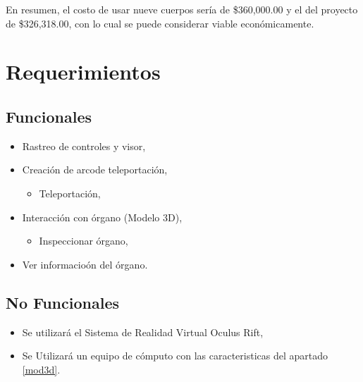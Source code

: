 En resumen, el costo de usar nueve cuerpos sería de \$360,000.00 y el del proyecto de \$326,318.00, con lo cual se puede considerar viable económicamente.\\

\section{Requerimientos}

\subsection{Funcionales}
\begin{itemize}
  \item Rastreo de controles y visor,
  \item Creaci\'on de arcode teleportación,
  \begin{itemize}
    \item Teleportaci\'on,
  \end{itemize}
  \item Interacci\'on con órgano (Modelo 3D),
  \begin{itemize}
    \item Inspeccionar órgano,
  \end{itemize}
  \item Ver informacio\'on del \'organo.
\end{itemize}
\subsection{No Funcionales}
\begin{itemize}
  \item Se utilizará el Sistema de Realidad Virtual Oculus Rift, 
  \item Se Utilizará un equipo de cómputo con las caracteristicas del apartado \ref{mod3d}. 
\end{itemize}

